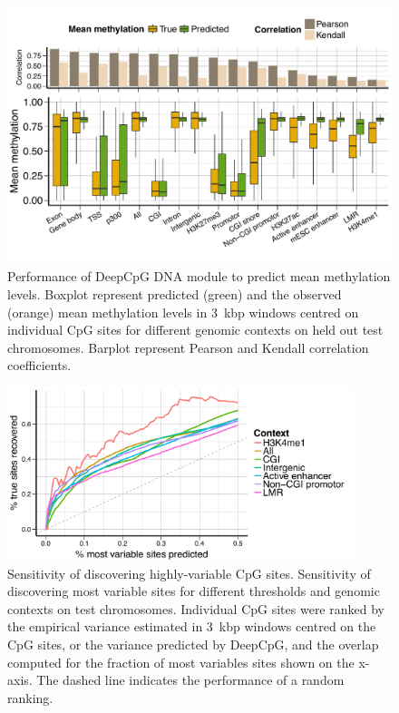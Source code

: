 \begin{figure}[htbp!]
\centering
\includegraphics[width=1.0\textwidth]{var_mean}
\caption[Prediction performance of mean methylation levels.]{Performance of DeepCpG DNA module to predict mean methylation levels. Boxplot represent predicted (green) and the observed (orange) mean methylation levels in 3~kbp windows centred on individual CpG sites for different genomic contexts on held out test chromosomes. Barplot represent Pearson and Kendall correlation coefficients.}
\label{fig:dcpg_var_mean}
\end{figure}

\begin{figure}[htbp!]
\centering
\includegraphics[width=0.9\textwidth]{var_rank}
\caption[Sensitivity of discovering highly-variable CpG sites.]{Sensitivity of discovering highly-variable CpG sites. Sensitivity of discovering most variable sites for different thresholds and genomic contexts on test chromosomes. Individual CpG sites were ranked by the empirical variance estimated in 3~kbp windows centred on the CpG sites, or the variance predicted by DeepCpG, and the overlap computed for the fraction of most variables sites shown on the x-axis. The dashed line indicates the performance of a random ranking.}
\label{fig:dcpg_var_rank}
\end{figure}


